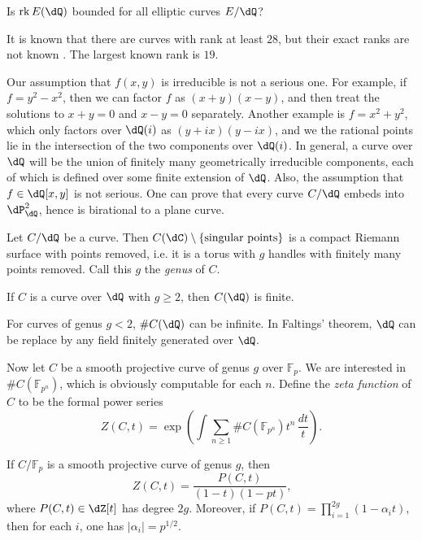 \documentclass{article}
\begin{document}
\begin{question}
Is $\rank E(\dQ)$ bounded for all elliptic curves 
$E/\dQ$?
\end{question}

It is known that there are curves with rank at least $28$, but their exact 
ranks are not known \cite{du}. The largest known rank is $19$. 

Our assumption that $f(x,y)$ is irreducible is not a serious one. For example, 
if $f=y^2-x^2$, then we can factor $f$ as $(x+y)(x-y)$, and then treat the 
solutions to $x+y=0$ and $x-y=0$ separately. Another example is $f=x^2+y^2$, 
which only factors over $\dQ(i)$ as $(y+i x)(y-i x)$, and we the rational 
points lie in the intersection of the two components over $\dQ(i)$. In general, 
a curve over $\dQ$ will be the union of finitely many geometrically irreducible 
components, each of which is defined over some finite extension of $\dQ$. Also, 
the assumption that $f\in \dQ[x,y]$ is not serious. One can prove that every 
curve $C/\dQ$ embeds into $\dP^2_\dQ$, hence is birational to a plane curve. 

Let $C/\dQ$ be a curve. Then 
$C(\dC)\setminus \{\text{singular points}\}$ is a compact Riemann 
surface with points removed, i.e. it is a torus with $g$ handles with finitely 
many points removed. Call this $g$ the \emph{genus} of $C$. 

\begin{theorem}
If $C$ is a curve over $\dQ$ with $g\geqslant 2$, then $C(\dQ)$ 
is finite. 
\end{theorem}

For curves of genus $g<2$, $\# C(\dQ)$ can be infinite. In Faltings' 
theorem, $\dQ$ can be replace by any field finitely generated over 
$\dQ$. 

Now let $C$ be a smooth projective curve of genus $g$ over $\mathbb{F}_p$. 
We are interested in $\#C(\mathbb{F}_{p^n})$, which is obviously computable 
for each $n$. Define the \emph{zeta function} of $C$ to be the formal power 
series 
\[
  Z(C,t) = \exp\left( \int\sum_{n\geqslant 1} \# C(\mathbb{F}_{p^n}) t^n\, \frac{dt}{t}\right) \text{.}
\]

\begin{theorem}[Weil]
If $C/\mathbb{F}_p$ is a smooth projective curve of genus $g$, then 
\[
  Z(C,t) = \frac{P(C,t)}{(1-t)(1-p t)} \text{,}
\]
where $P(C,t)\in \dZ[t]$ has degree $2 g$. Moreover, if 
$P(C,t) = \prod_{i=1}^{2 g} (1-\alpha_i t)$, then for each $i$, one has 
$|\alpha_i|=p^{1/2}$. 
\end{theorem}
\end{document}
